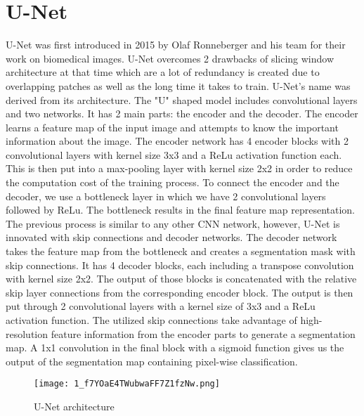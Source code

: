 \documentclass[twocolumn]{report}
\begin{document}
\section{U-Net}
U-Net was first introduced in 2015 by Olaf Ronneberger and his team for their work on biomedical images. U-Net overcomes 2 drawbacks of slicing window architecture at that time which are a lot of redundancy is created due to overlapping patches as well as the long time it takes to train. 
U-Net's name was derived from its architecture. The "U" shaped model includes convolutional layers and two networks. It has 2 main parts: the encoder and the decoder. The encoder learns a feature map of the input image and attempts to know the important information about the image. The encoder network has 4 encoder blocks with 2 convolutional layers with kernel size 3x3 and a ReLu activation function each. This is then put into a max-pooling layer with kernel size 2x2 in order to reduce the computation cost of the training process. To connect the encoder and the decoder, we use a bottleneck layer in which we have 2 convolutional layers followed by ReLu. The bottleneck results in the final feature map representation. The previous process is similar to any other CNN network, however, U-Net is innovated with skip connections and decoder networks. The decoder network takes the feature map from the bottleneck and creates a segmentation mask with skip connections. It has 4 decoder blocks, each including a transpose convolution with kernel size 2x2. The output of those blocks is concatenated with the relative skip layer connections from the corresponding encoder block. The output is then put through 2 convolutional layers with a kernel size of 3x3 and a ReLu activation function. The utilized skip connections take advantage of high-resolution feature information from the encoder parts to generate a segmentation map. A 1x1 convolution in the final block with a sigmoid function gives us the output of the segmentation map containing pixel-wise classification. 
\begin{figure}[H]
    \centering
    \texttt{[image: 1\_f7YOaE4TWubwaFF7Z1fzNw.png]}
    \caption{U-Net architecture}
    \label{fig:enter-label}
\end{figure}
\end{document}
